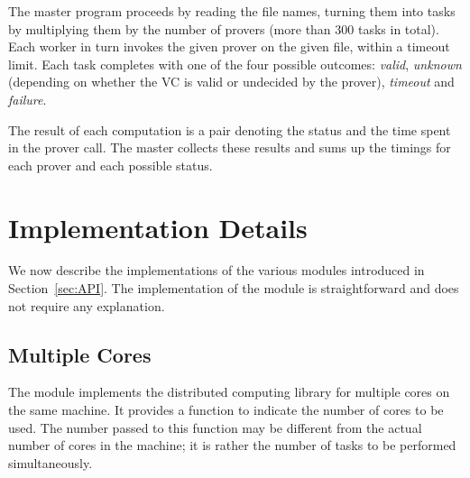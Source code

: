 \documentclass[a4paper,12pt]{article}
\begin{document}
The master program proceeds by reading the file names, turning them
into tasks by multiplying them by the number of provers (more than
300 tasks in total).
Each worker in turn invokes the given prover on the given file, within
a timeout limit.
Each task completes with one of the four possible outcomes: \emph{valid},
\emph{unknown} (depending on
whether the VC is valid or undecided by the prover), 
\emph{timeout} and \emph{failure}.

The result of each computation is a pair denoting the status and the
time spent in the prover call. The master collects these results and
sums up the timings for each prover and each possible status.

\section{Implementation Details}\label{sec:implem}

We now describe the implementations of the various modules introduced
in Section~\ref{sec:API}. The implementation of the 
module is straightforward and does not require any explanation.

\subsection{Multiple Cores}

The  module implements the distributed computing library for
multiple cores on the same machine. 
It provides a function
 to indicate the number of cores
to be used. The number passed to this function may be different from
the actual number of cores in the machine; it is rather the number of
tasks to be performed simultaneously.
\end{document}
